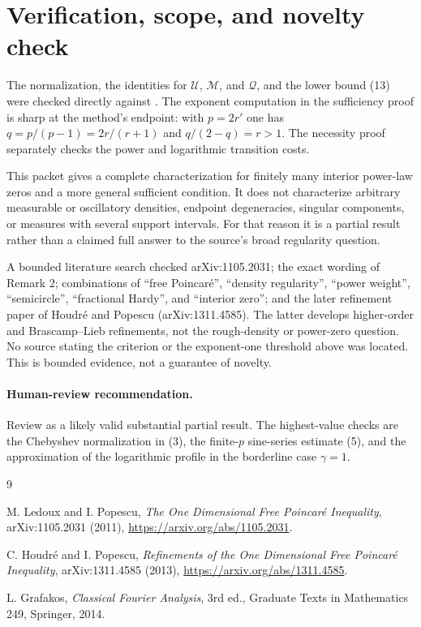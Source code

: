 \documentclass[11pt]{article}
\newcommand{\Qf}{\mathcal{Q}}
\begin{document}
\section{Verification, scope, and novelty check}

The normalization, the identities for $\mathcal U$, $\mathcal M$, and
$\Qf$, and the lower bound (13) were checked directly against \cite{LP}.
The exponent computation in the sufficiency proof is sharp at the method's
endpoint: with $p=2r'$ one has
$q=p/(p-1)=2r/(r+1)$ and $q/(2-q)=r>1$. The necessity proof separately
checks the power and logarithmic transition costs.

This packet gives a complete characterization for finitely many interior
power-law zeros and a more general sufficient condition. It does not
characterize arbitrary measurable or oscillatory densities, endpoint
degeneracies, singular components, or measures with several support
intervals. For that reason it is a partial result rather than a claimed full
answer to the source's broad regularity question.

A bounded literature search checked arXiv:1105.2031; the exact wording of
Remark 2; combinations of ``free Poincar\'e'', ``density regularity'',
``power weight'', ``semicircle'', ``fractional Hardy'', and ``interior zero'';
and the later refinement paper of Houdr\'e and Popescu
\cite{HP} (arXiv:1311.4585). The latter develops higher-order and
Brascamp--Lieb refinements, not the rough-density or power-zero question.
No source stating the criterion or the exponent-one threshold above was
located. This is bounded evidence, not a guarantee of novelty.

\paragraph{Human-review recommendation.}
Review as a likely valid substantial partial result. The highest-value checks
are the Chebyshev normalization in (3), the finite-$p$ sine-series estimate
(5), and the approximation of the logarithmic profile in the borderline
case $\gamma=1$.

\begin{thebibliography}{9}

M. Ledoux and I. Popescu,
\emph{The One Dimensional Free Poincar\'e Inequality},
arXiv:1105.2031 (2011),
\url{https://arxiv.org/abs/1105.2031}.

C. Houdr\'e and I. Popescu,
\emph{Refinements of the One Dimensional Free Poincar\'e Inequality},
arXiv:1311.4585 (2013),
\url{https://arxiv.org/abs/1311.4585}.

L. Grafakos,
\emph{Classical Fourier Analysis}, 3rd ed.,
Graduate Texts in Mathematics 249, Springer, 2014.

\end{thebibliography}
\end{document}
